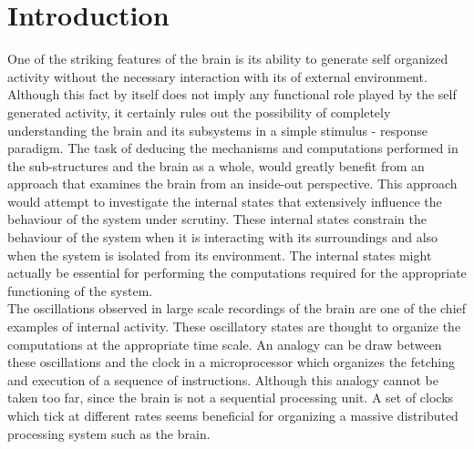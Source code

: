 
\chapter{Introduction} 

\label{intro}

One of the striking features of the brain is its ability to generate self organized activity without the necessary interaction with its of external environment. Although this fact by itself does not imply any functional role played by the self generated activity, it certainly rules out the possibility of completely understanding the brain and its subsystems in a simple stimulus - response paradigm. The task of deducing the mechanisms and computations performed in the sub-structures and  the brain as a whole, would greatly benefit from an approach that examines the brain from an inside-out perspective. This approach would attempt to investigate the internal states that extensively influence the behaviour of the system under scrutiny. These internal states constrain the behaviour of the system when it is interacting with its surroundings and also when the system is isolated from its environment. The internal states might actually be essential for performing the computations required for the appropriate functioning of the system. \\

The oscillations observed in large scale recordings of the brain are one of the chief examples of internal  activity. These oscillatory states are thought to organize the computations at the appropriate time scale. An analogy can be draw between these oscillations and the clock in a microprocessor which organizes the fetching and execution of a sequence of instructions. Although this analogy cannot be taken too far, since the brain is not a sequential processing unit. A set of clocks which tick at different rates seems beneficial for organizing a massive distributed processing system such as the brain. \\

